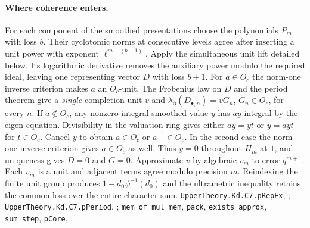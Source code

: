 \paragraph{Where coherence enters.}
For each component of the smoothed presentations choose the polynomials
$P_m$ with loss $b$. Their cyclotomic norms at consecutive levels agree
after inserting a unit power with exponent $\ell^{m-(b+1)}$.
Apply the simultaneous unit lift detailed below. Its logarithmic derivative
removes the auxiliary power modulo the required ideal, leaving one
representing vector $D$ with loss $b+1$. For $a\in O_c$ the norm-one
inverse criterion makes $a$ an $O_c$-unit. The Frobenius law on $D$ and
the period theorem give a \emph{single} completion unit $v$ and
$\lambda_\beta(D_{\bullet,n})=v G_n$, $G_n\in O_c$, for every $n$.
If $a\notin O_c$, any nonzero integral smoothed value $y$ has $ay$ integral
by the eigen-equation. Divisibility in the valuation ring gives either $ay=yt$ or $y=ayt$ for
$t\in O_c$. Cancel $y$ to obtain $a\in O_c$ or $a^{-1}\in O_c$.
In the second case the norm-one inverse criterion gives $a\in O_c$ as well. Thus $y=0$
throughout $H_m$ at $1$, and uniqueness gives $D=0$ and $G=0$.
Approximate $v$ by algebraic $v_m$ to error $q^{m+1}$. Each $v_m$ is a
unit and adjacent terms agree modulo precision $m$. Reindexing the finite
unit group produces $1-d_0\psi^{-1}(d_0)$ and the ultrametric inequality
retains the common loss over the entire character sum.
{\footnotesize\nolinkurl{UpperTheory.Kd.C7.pRepEx},
;
\nolinkurl{UpperTheory.Kd.C7.pPeriod}, ;
\nolinkurl{mem_of_mul_mem}, \nolinkurl{pack}, \nolinkurl{exists_approx},
\nolinkurl{sum_step}, \nolinkurl{pCore},
.}


